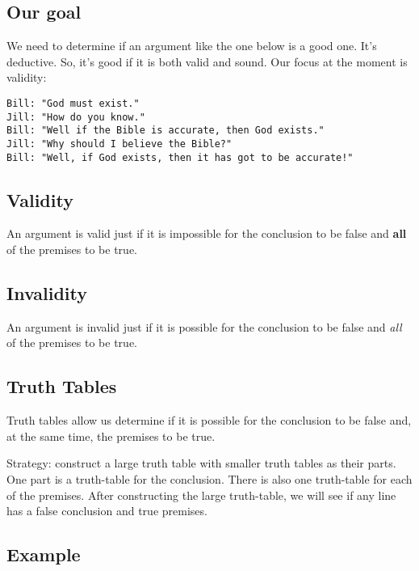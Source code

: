 \documentclass[]{article}
\date{}
\begin{document}
\subsection{Our goal}\label{our-goal}

We need to determine if an argument like the one below is a good one.
It's deductive. So, it's good if it is both valid and sound. Our focus
at the moment is validity:

\begin{verbatim}
Bill: "God must exist." 
Jill: "How do you know." 
Bill: "Well if the Bible is accurate, then God exists." 
Jill: "Why should I believe the Bible?" 
Bill: "Well, if God exists, then it has got to be accurate!"
\end{verbatim}

\subsection{Validity}\label{validity}

An argument is valid just if it is impossible for the conclusion to be
false and \textbf{all} of the premises to be true.

\subsection{Invalidity}\label{invalidity}

An argument is invalid just if it is possible for the conclusion to be
false and \emph{all} of the premises to be true.

\subsection{Truth Tables}\label{truth-tables}

Truth tables allow us determine if it is possible for the conclusion to
be false and, at the same time, the premises to be true.

Strategy: construct a large truth table with smaller truth tables as
their parts. One part is a truth-table for the conclusion. There is also
one truth-table for each of the premises. After constructing the large
truth-table, we will see if any line has a false conclusion and true
premises.

\subsection{Example}\label{example}
\end{document}
